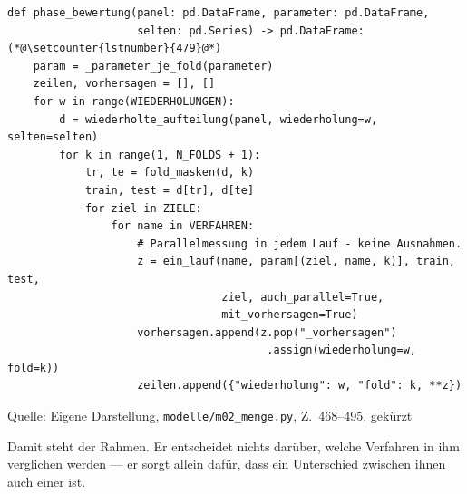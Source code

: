 \documentclass[12pt,a4paper]{article}
\newcommand{\tabquelle}[1][Eigene Darstellung]{%
  \par\setlength{\parskip}{0pt}\vspace{3pt}%
  {\setstretch{1}\fontsize{9pt}{11pt}\selectfont\raggedright Quelle: #1\par}%
}
\begin{document}
\begin{quellcode}[htbp]
\caption{Der Bewertungslauf über alle Wiederholungen und Folds}
\label{lst:modelllauf}\vspace{-3.5pt}
\begin{lstlisting}[style=pythonstil,firstnumber=468]
def phase_bewertung(panel: pd.DataFrame, parameter: pd.DataFrame,
                    selten: pd.Series) -> pd.DataFrame:(*@\setcounter{lstnumber}{479}@*)
    param = _parameter_je_fold(parameter)
    zeilen, vorhersagen = [], []
    for w in range(WIEDERHOLUNGEN):
        d = wiederholte_aufteilung(panel, wiederholung=w, selten=selten)
        for k in range(1, N_FOLDS + 1):
            tr, te = fold_masken(d, k)
            train, test = d[tr], d[te]
            for ziel in ZIELE:
                for name in VERFAHREN:
                    # Parallelmessung in jedem Lauf - keine Ausnahmen.
                    z = ein_lauf(name, param[(ziel, name, k)], train, test,
                                 ziel, auch_parallel=True,
                                 mit_vorhersagen=True)
                    vorhersagen.append(z.pop("_vorhersagen")
                                        .assign(wiederholung=w, fold=k))
                    zeilen.append({"wiederholung": w, "fold": k, **z})
\end{lstlisting}
\tabquelle[Eigene Darstellung, \texttt{modelle/m02\_menge.py}, Z.~468--495, gekürzt]
\end{quellcode}



Damit steht der Rahmen. Er entscheidet nichts darüber, welche Verfahren in
ihm verglichen werden --- er sorgt allein dafür, dass ein Unterschied
zwischen ihnen auch einer ist.
\end{document}
